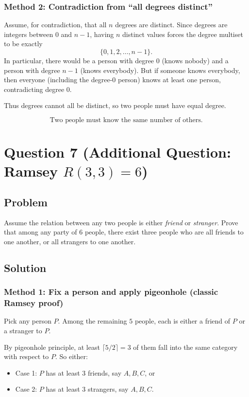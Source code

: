 \documentclass[12pt]{article}
\begin{document}
\subsubsection{Method 2: Contradiction from ``all degrees distinct''}
Assume, for contradiction, that all $n$ degrees are distinct. Since degrees are integers between $0$ and $n-1$, having $n$ distinct values forces the degree multiset to be exactly
\[
\{0,1,2,\dots,n-1\}.
\]
In particular, there would be a person with degree $0$ (knows nobody) and a person with degree $n-1$ (knows everybody). But if someone knows everybody, then everyone (including the degree-$0$ person) knows at least one person, contradicting degree $0$.

Thus degrees cannot all be distinct, so two people must have equal degree.

\[
\boxed{\text{Two people must know the same number of others.}}
\]

\newpage

\section{Question 7 (Additional Question: Ramsey $R(3,3)=6$)}
\subsection{Problem}
Assume the relation between any two people is either \emph{friend} or \emph{stranger}. Prove that among any party of $6$ people, there exist three people who are all friends to one another, or all strangers to one another.

\subsection{Solution}

\subsubsection{Method 1: Fix a person and apply pigeonhole (classic Ramsey proof)}
Pick any person $P$. Among the remaining $5$ people, each is either a friend of $P$ or a stranger to $P$.

By pigeonhole principle, at least $\lceil 5/2\rceil = 3$ of them fall into the same category with respect to $P$.
So either:
\begin{itemize}[leftmargin=*]
\item Case 1: $P$ has at least $3$ friends, say $A,B,C$, or
\item Case 2: $P$ has at least $3$ strangers, say $A,B,C$.
\end{itemize}
\end{document}
